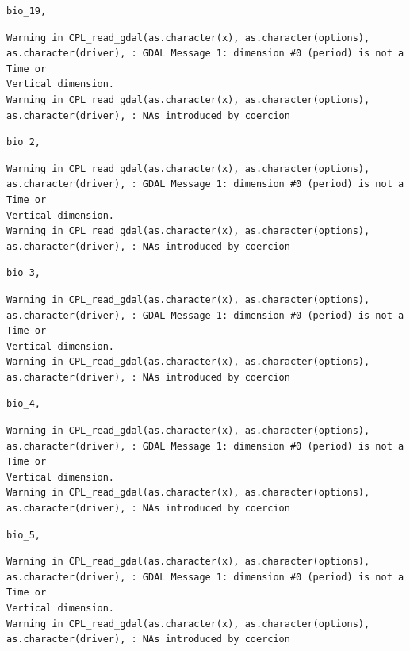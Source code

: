 \documentclass[
  authoryear,
  preprint]{elsarticle}
\begin{document}
\begin{verbatim}
bio_19, 
\end{verbatim}

\begin{verbatim}
Warning in CPL_read_gdal(as.character(x), as.character(options),
as.character(driver), : GDAL Message 1: dimension #0 (period) is not a Time or
Vertical dimension.
Warning in CPL_read_gdal(as.character(x), as.character(options),
as.character(driver), : NAs introduced by coercion
\end{verbatim}

\begin{verbatim}
bio_2, 
\end{verbatim}

\begin{verbatim}
Warning in CPL_read_gdal(as.character(x), as.character(options),
as.character(driver), : GDAL Message 1: dimension #0 (period) is not a Time or
Vertical dimension.
Warning in CPL_read_gdal(as.character(x), as.character(options),
as.character(driver), : NAs introduced by coercion
\end{verbatim}

\begin{verbatim}
bio_3, 
\end{verbatim}

\begin{verbatim}
Warning in CPL_read_gdal(as.character(x), as.character(options),
as.character(driver), : GDAL Message 1: dimension #0 (period) is not a Time or
Vertical dimension.
Warning in CPL_read_gdal(as.character(x), as.character(options),
as.character(driver), : NAs introduced by coercion
\end{verbatim}

\begin{verbatim}
bio_4, 
\end{verbatim}

\begin{verbatim}
Warning in CPL_read_gdal(as.character(x), as.character(options),
as.character(driver), : GDAL Message 1: dimension #0 (period) is not a Time or
Vertical dimension.
Warning in CPL_read_gdal(as.character(x), as.character(options),
as.character(driver), : NAs introduced by coercion
\end{verbatim}

\begin{verbatim}
bio_5, 
\end{verbatim}

\begin{verbatim}
Warning in CPL_read_gdal(as.character(x), as.character(options),
as.character(driver), : GDAL Message 1: dimension #0 (period) is not a Time or
Vertical dimension.
Warning in CPL_read_gdal(as.character(x), as.character(options),
as.character(driver), : NAs introduced by coercion
\end{verbatim}
\end{document}
